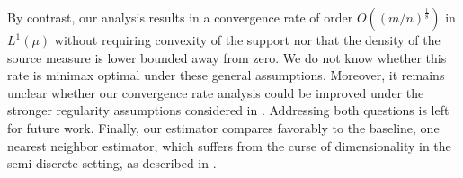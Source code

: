 \documentclass[11pt]{article}
\newcommand{\1}{\mathbbm{1}}
\numberwithin{equation}{section}
\begin{document}
By contrast, our analysis results in a convergence rate of order $O\left(\left(m/n\right)^{\frac{1}{8}}\right)$ in $L^1(\mu)$ without requiring convexity of the support nor that the density of the source measure is lower bounded away from zero.
We do not know whether this rate is minimax optimal under these general assumptions. Moreover, it remains unclear whether our convergence rate analysis could be improved under the stronger regularity assumptions considered in \cite{pooladian2023minimax}. Addressing both questions is left for future work. Finally, our estimator compares favorably to the baseline, one nearest neighbor estimator, which suffers from the curse of dimensionality in the semi-discrete setting, as described in \cite{pooladian2023minimax}.
\end{document}
